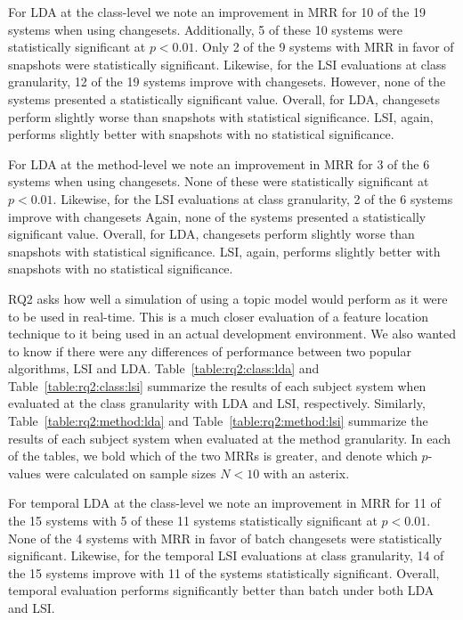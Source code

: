 For LDA at the class-level we note an improvement in MRR for 10 of the 19 systems when using changesets.
Additionally, 5 of these 10 systems were statistically significant at $p<0.01$.
Only 2 of the 9 systems with MRR in favor of snapshots were statistically significant.
Likewise, for the LSI evaluations at class granularity, 12 of the 19 systems improve with changesets.
However, none of the systems presented a statistically significant value.
Overall, for LDA, changesets perform slightly worse than snapshots with statistical significance.
LSI, again, performs slightly better with snapshots with no statistical significance.

For LDA at the method-level we note an improvement in MRR for 3 of the 6 systems when using changesets.
None of these were statistically significant at $p<0.01$.
Likewise, for the LSI evaluations at class granularity, 2 of the 6 systems improve with changesets
Again, none of the systems presented a statistically significant value.
Overall, for LDA, changesets perform slightly worse than snapshots with statistical significance.
LSI, again, performs slightly better with snapshots with no statistical significance.








RQ2 asks how well a simulation of using a topic model would perform as
it were to be used in real-time.
This is a much closer evaluation of a feature location technique to it
being used in an actual development environment.
We also wanted to know if there were any differences of performance
between two popular algorithms, LSI and LDA.
Table~\ref{table:rq2:class:lda} and Table~\ref{table:rq2:class:lsi}
summarize the results of each subject system when
evaluated at the class granularity with LDA and LSI, respectively.
Similarly, Table~\ref{table:rq2:method:lda} and Table~\ref{table:rq2:method:lsi}
summarize the results of each subject system when
evaluated at the method granularity.
In each of the tables, we bold which of the two MRRs is greater,
and denote which $p$-values were calculated on sample sizes $N<10$ with an asterix.

For temporal LDA at the class-level we note an improvement in MRR for 11 of the 15 systems
with 5 of these 11 systems statistically significant at $p<0.01$.
None of the 4 systems with MRR in favor of batch changesets were statistically significant.
Likewise, for the temporal LSI evaluations at class granularity, 14 of the 15 systems improve
with 11 of the systems statistically significant.
Overall, temporal evaluation performs significantly better than batch under both LDA and LSI.


